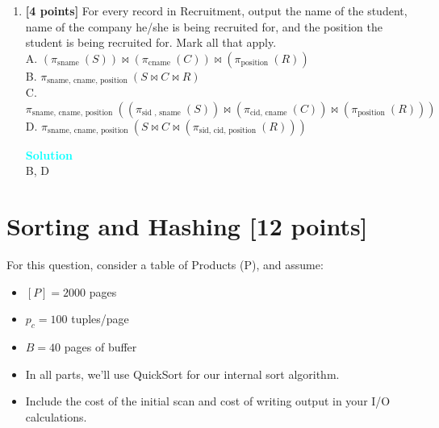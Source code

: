 \documentclass[10pt]{article}
\newenvironment{solution}
    { \begin{mdframed}[backgroundcolor=gray!10] \textcolor{cyan}{\textbf{Solution}} \\}
    {  \end{mdframed}}
\begin{document}
\begin{enumerate}
\item \textbf{[4 points]} For every record in Recruitment, output the name of
the student, name of the company he/she is being recruited for, and
the position the student is being recruited for. Mark all that apply.\\
A. $\left(\pi_{\text{sname }}(S)\right)\bowtie\left(\pi_{\text{cname }}(C)\right)\bowtie\left(\pi_{\text{position }}(R)\right)$\\
B. $\pi_{\text{sname, cname, position }}(S\bowtie C\bowtie R)$\\
C. $\pi_{\text{sname, cname, position }}\left(\left(\pi_{\text{sid },\text{ sname }}(S)\right)\bowtie\left(\pi_{\text{cid, cname }}(C)\right)\bowtie\left(\pi_{\text{position }}(R)\right)\right)$\\
D. $\pi_{\text{sname, cname, position }}\left(S\bowtie C\bowtie\left(\pi_{\text{sid, cid, position }}(R)\right)\right)$\\
\begin{solution}
B, D
\end{solution}
\end{enumerate}



\newpage
\section{Sorting and Hashing \textbf{[12 points]}}
For this question, consider a table of Products (P), and assume:
\begin{itemize}
\item $[P] = 2000$ pages
\item $p_c = 100$ tuples/page
\item $B = 40$ pages of buffer
\item In all parts, we’ll use QuickSort for our internal sort algorithm.
\item Include the cost of the initial scan and cost of writing output in your I/O calculations.
\end{itemize}
\end{document}
